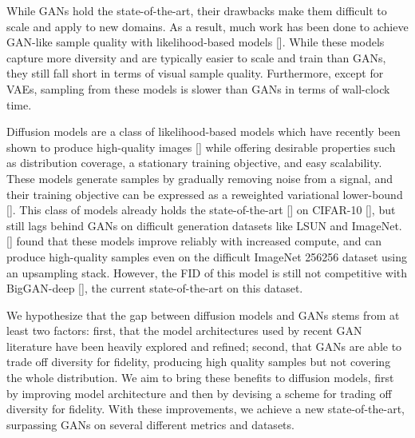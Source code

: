 \documentclass{article}
\newcommand{\shortcite}[1]{[\citenum{#1}]}
\newcommand{\namecite}[1]{\citeauthor{#1} [\citenum{#1}]}
\begin{document}
While GANs hold the state-of-the-art, their drawbacks make them difficult to scale and apply to new domains. As a result, much work has been done to achieve GAN-like sample quality with likelihood-based models \shortcite{vqvae2,ddpm,dctransformer,vdvae}. While these models capture more diversity and are typically easier to scale and train than GANs, they still fall short in terms of visual sample quality. Furthermore, except for VAEs, sampling from these models is slower than GANs in terms of wall-clock time.

Diffusion models are a class of likelihood-based models which have recently been shown to produce high-quality images \shortcite{dickstein,scorematching,ddpm} while offering desirable properties such as distribution coverage, a stationary training objective, and easy scalability. These models generate samples by gradually removing noise from a signal, and their training objective can be expressed as a reweighted variational lower-bound \shortcite{ddpm}. This class of models already holds the state-of-the-art \shortcite{sde} on CIFAR-10 \shortcite{cifar10}, but still lags behind GANs on difficult generation datasets like LSUN and ImageNet. \namecite{improved} found that these models improve reliably with increased compute, and can produce high-quality samples even on the difficult ImageNet 256256 dataset using an upsampling stack. However, the FID of this model is still not competitive with BigGAN-deep \shortcite{biggan}, the current state-of-the-art on this dataset.

We hypothesize that the gap between diffusion models and GANs stems from at least two factors: first, that the model architectures used by recent GAN literature have been heavily explored and refined; second, that GANs are able to trade off diversity for fidelity, producing high quality samples but not covering the whole distribution. We aim to bring these benefits to diffusion models, first by improving model architecture and then by devising a scheme for trading off diversity for fidelity. With these improvements, we achieve a new state-of-the-art, surpassing GANs on several different metrics and datasets.
\end{document}
